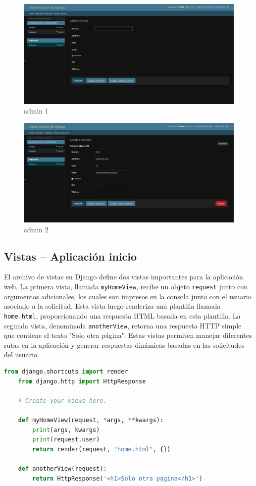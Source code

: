 \documentclass{article}
\begin{document}
  \begin{figure}[H]
    \centering
    \includegraphics[width=1\textwidth, keepaspectratio]{img/model1.png}
    \caption{admin 1}
  \end{figure}
  \begin{figure}[H]
    \centering
    \includegraphics[width=1\textwidth, keepaspectratio]{img/model2.png}
    \caption{admin 2}
  \end{figure}
  \newpage
    

  \subsection{Vistas -- Aplicación inicio}
  El archivo de vistas en Django define dos vistas importantes para la aplicación web. La primera vista, llamada \texttt{myHomeView}, 
  recibe un objeto \texttt{request} junto con argumentos adicionales, los cuales son impresos en la consola junto con el usuario 
  asociado a la solicitud. Esta vista luego renderiza una plantilla llamada \texttt{home.html}, proporcionando una respuesta HTML 
  basada en esta plantilla. La segunda vista, denominada \texttt{anotherView}, retorna una respuesta HTTP simple que contiene el 
  texto "Solo otra página". Estas vistas permiten manejar diferentes rutas en la aplicación y generar respuestas dinámicas basadas 
  en las solicitudes del usuario.
  \begin{lstlisting}[language=python]
    from django.shortcuts import render
    from django.http import HttpResponse

    # Create your views here.

    def myHomeView(request, *args, **kwargs):
        print(args, kwargs)
        print(request.user)
        return render(request, "home.html", {})
        
    def anotherView(request):
        return HttpResponse('<h1>Solo otra pagina</h1>')
  \end{lstlisting}
\end{document}
